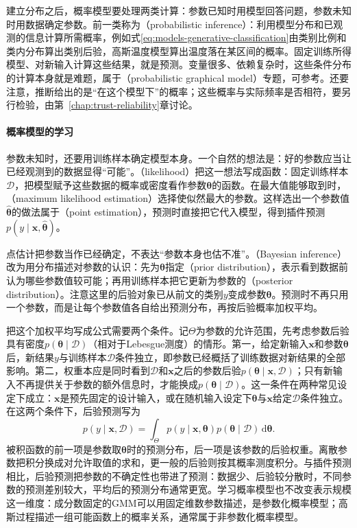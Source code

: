 建立分布之后，概率模型要处理两类计算：参数已知时用模型回答问题，参数未知时用数据确定参数。前一类称为（probabilistic inference）：利用模型分布和已观测的信息计算所需概率，例如式\eqref{eq:models-generative-classification}由类别比例和类内分布算出类别后验，高斯温度模型算出温度落在某区间的概率。固定训练所得模型、对新输入计算这些结果，就是预测。变量很多、依赖复杂时，这些条件分布的计算本身就是难题，属于（probabilistic graphical model）专题，可参考。还要注意，推断给出的是“在这个模型下”的概率；这些概率与实际频率是否相符，要另行检验，由第~\ref{chap:trust-reliability}章讨论。

\paragraph{概率模型的学习}

参数未知时，还要用训练样本确定模型本身。一个自然的想法是：好的参数应当让已经观测到的数据显得“可能”。（likelihood）把这一想法写成函数：固定训练样本$\mathcal{D}$，把模型赋予这些数据的概率或密度看作参数$\bm{\theta}$的函数。在最大值能够取到时，（maximum likelihood estimation）选择使似然最大的参数。这样选出一个参数值$\hat{\bm{\theta}}$的做法属于（point estimation），预测时直接把它代入模型，得到插件预测$p(y\mid\bm{x},\hat{\bm{\theta}})$。

点估计把参数当作已经确定，不表达“参数本身也估不准”。（Bayesian inference）改为用分布描述对参数的认识：先为$\bm{\theta}$指定（prior distribution），表示看到数据前认为哪些参数值较可能；再用训练样本把它更新为参数的（posterior distribution）。注意这里的后验对象已从前文的类别$y$变成参数$\bm{\theta}$。预测时不再只用一个参数，而是让每个参数值各自给出预测分布，再按后验概率加权平均。

把这个加权平均写成公式需要两个条件。记$\Theta$为参数的允许范围，先考虑参数后验具有密度$p(\bm{\theta}\mid\mathcal{D})$（相对于Lebesgue测度）的情形。第一，给定新输入$\bm{x}$和参数$\bm{\theta}$后，新结果$y$与训练样本$\mathcal{D}$条件独立，即参数已经概括了训练数据对新结果的全部影响。第二，权重本应是同时看到$\mathcal{D}$和$\bm{x}$之后的参数后验$p(\bm\theta\mid\bm{x},\mathcal D)$；只有新输入不再提供关于参数的额外信息时，才能换成$p(\bm\theta\mid\mathcal D)$。这一条件在两种常见设定下成立：$\bm{x}$是预先固定的设计输入，或在随机输入设定下$\bm\theta$与$\bm{x}$给定$\mathcal D$条件独立。在这两个条件下，后验预测写为
\[
  p(y\mid\bm{x},\mathcal{D})
  =\int_{\Theta} p(y\mid\bm{x},\bm{\theta})
    p(\bm{\theta}\mid\mathcal{D})\,\mathrm d\bm{\theta}.
\]
被积函数的前一项是参数取$\bm{\theta}$时的预测分布，后一项是该参数的后验权重。离散参数把积分换成对允许取值的求和，更一般的后验则按其概率测度积分。与插件预测相比，后验预测把参数的不确定性也带进了预测：数据少、后验较分散时，不同参数的预测差别较大，平均后的预测分布通常更宽。学习概率模型也不改变表示规模这一维度：成分数固定的GMM可以用固定维数参数描述，是参数化概率模型；高斯过程描述一组可能函数上的概率关系，通常属于非参数化概率模型。

